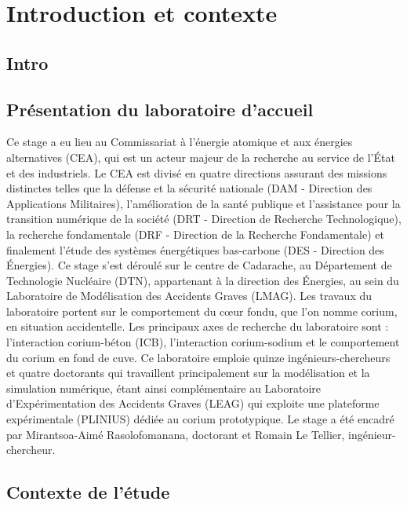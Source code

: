\chapter{Introduction et contexte}
%
\section{Intro}
\section{Présentation du laboratoire d'accueil}
Ce stage a eu lieu au Commissariat à l'énergie atomique et aux énergies alternatives (CEA), qui est un acteur majeur de la recherche au service de l'État et des industriels. Le CEA est divisé en quatre directions assurant des missions distinctes telles que la défense et la sécurité nationale (DAM - Direction des Applications Militaires), l'amélioration de la santé publique et l'assistance pour la transition numérique de la société (DRT - Direction de Recherche Technologique), la recherche fondamentale (DRF - Direction de la Recherche Fondamentale) et finalement l'étude des systèmes énergétiques bas-carbone (DES - Direction des Énergies). Ce stage s'est déroulé sur le centre de Cadarache, au Département de Technologie Nucléaire (DTN), appartenant à la direction des Énergies, au sein du Laboratoire de Modélisation des Accidents Graves (LMAG). Les travaux du laboratoire portent sur le comportement du c\oe ur fondu, que l'on nomme corium, en situation accidentelle. Les principaux axes de recherche du laboratoire sont : l'interaction corium-béton (ICB), l'interaction corium-sodium et le comportement du corium en fond de cuve. Ce laboratoire emploie quinze ingénieurs-chercheurs et quatre doctorants qui travaillent principalement sur la modélisation et la simulation numérique, étant ainsi complémentaire au Laboratoire d'Expérimentation des Accidents Graves (LEAG) qui exploite une plateforme expérimentale (PLINIUS) dédiée au corium prototypique. Le stage a été encadré par Mirantsoa-Aimé Rasolofomanana, doctorant et Romain Le Tellier, ingénieur-chercheur.



\section{Contexte de l'étude}
